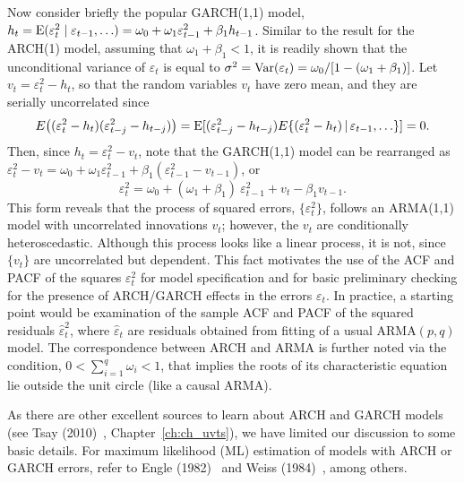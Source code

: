 Now consider briefly the popular GARCH(1,1) model, $h_t = \operatorname{E}(\varepsilon_t^2 \;|\; \varepsilon_{t-1}, \ldots) = \omega_0 + \omega_1\varepsilon_{t-1}^2 + \beta_1h_{t-1}$. Similar to the result for the ARCH(1) model, assuming that $\omega_1 + \beta_1 < 1$, it is readily shown that the unconditional variance of $\varepsilon_t$ is equal to $\sigma^2 = \operatorname{Var}(\varepsilon_t) = \omega_0/[1 - (\omega_1 + \beta_1)]$. Let $v_t = \varepsilon_t^2 - h_t$, so that the random variables $v_t$ have zero mean, and they are serially uncorrelated since
	\[
	E\big( (\varepsilon_t^2 - h_t) (\varepsilon_{t-j}^2 - h_{t-j}) \big)= \operatorname{E}[(\varepsilon_{t-j}^2 - h_{t-j}) E\{(\varepsilon_t^2 - h_t) \,|\, \varepsilon_{t-1},\ldots\}] = 0.
	\]
Then, since $h_t = \varepsilon_t^2 - v_t$, note that the GARCH(1,1) model can be rearranged as $\varepsilon_t^2 - v_t = \omega_0 + \omega_1\varepsilon_{t-1}^2 + \beta_1(\varepsilon_{t-1}^2 - v_{t-1})$, or
	\begin{equation} \label{eqn:2ept}
	\varepsilon_t^2 = \omega_0 + (\omega_1 + \beta_1)\ \varepsilon_{t-1}^2 + v_t - \beta_1v_{t-1}.
	\end{equation}
This form reveals that the process of squared errors, $\{\varepsilon_t^2\}$, follows an ARMA(1,1) model with uncorrelated innovations $v_t$; however, the $v_t$ are conditionally heteroscedastic. Although this process looks like a linear process, it is not, since $ \{ v_t \}$ are uncorrelated but dependent. This fact motivates the use of the ACF and PACF of the squares $\varepsilon_t^2$ for model specification and for basic preliminary checking for the presence of ARCH/GARCH effects in the errors $\varepsilon_t$. In practice, a starting point would be examination of the sample ACF and PACF of the squared residuals $\hat{\varepsilon}_t^2$, where $\hat{\varepsilon}_t$ are residuals obtained from fitting of a usual ARMA$(p,q)$ model. The correspondence between ARCH and ARMA is further noted via the condition, $0 < \sum_{i=1}^q \omega_i < 1$, that implies the roots of its characteristic equation lie outside the unit circle (like a causal ARMA).


As there are other excellent sources to learn about ARCH and GARCH models (see Tsay (2010)~\cite{tsay}, Chapter~\ref{ch:ch_uvts}), we have limited our discussion to some basic details. For maximum likelihood (ML) estimation of models with ARCH or GARCH errors, refer to Engle (1982)~\cite{engle1982} and Weiss (1984)~\cite{weiss1984}, among others. \twomedskip


